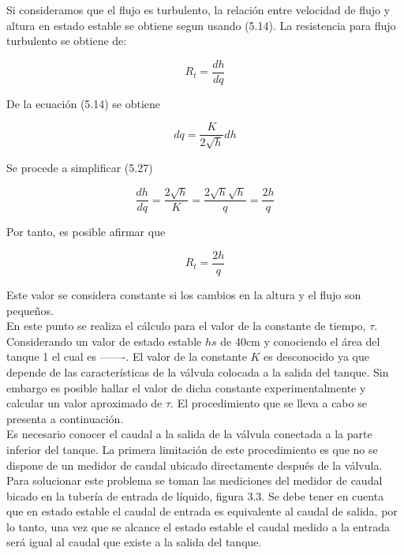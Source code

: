 \documentclass[a4paper,12pt,twoside]{proyectotanquesecci}
\begin{document}
Si consideramos que el flujo es turbulento, la relación entre velocidad de flujo y altura en estado estable se obtiene segun usando (5.14). La resistencia para flujo turbulento se obtiene de:

\begin{equation}
R_{t}=\frac{dh}{dq}
\end{equation}

De la ecuación (5.14) se obtiene

\begin{equation}
dq=\frac{K}{2\sqrt{h}}dh
\end{equation}

Se procede a simplificar (5.27)

\begin{equation}
\frac{dh}{dq}=\frac{2\sqrt{h}}{K}=\frac{2\sqrt{h}\sqrt{h}}{q}=\frac{2h}{q}
\end{equation}

Por tanto, es posible afirmar que

\begin{equation}
R_{t}=\frac{2h}{q}
\end{equation}

Este valor se considera constante si los cambios en la altura y el flujo son pequeños. \\






En este punto se realiza el cálculo para el valor de la constante de tiempo, $\tau$. Considerando un valor de estado estable $hs$ de 40cm y conociendo el área del tanque 1 el cual es -------. El valor de la constante $K$ es desconocido ya que depende de las características de la válvula colocada a la salida del tanque. Sin embargo es posible hallar el valor de dicha constante experimentalmente y calcular un valor aproximado de $\tau$. El procedimiento que se lleva a cabo se presenta a continuación. \\

Es necesario conocer el caudal a la salida de la válvula conectada a la parte inferior del tanque. La primera limitación de este procedimiento es
que no se dispone de un medidor de caudal ubicado directamente después de la válvula. Para solucionar este problema se toman las mediciones del medidor de caudal bicado en la tubería de entrada de líquido, figura 3.3. Se debe tener en cuenta que en estado estable el caudal de entrada es equivalente al caudal de salida, por lo tanto, una vez que se alcance el estado estable el caudal medido a la entrada será igual al caudal que
existe a la salida del tanque. \\
\end{document}
